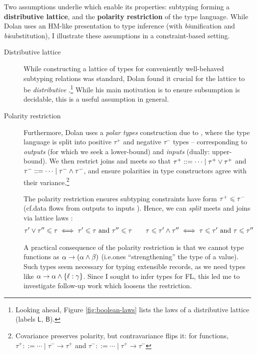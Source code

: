 Two assumptions underlie \mlsub{} which enable its properties: subtyping forming a \textbf{distributive lattice}, and the \textbf{polarity restriction} of the type language. While Dolan uses an HM-like presentation to type inference (with \emph{bi}unification and \emph{bi}substitution), I illustrate these assumptions in a constraint-based setting. \begin{description}
    \item[Distributive lattice] While constructing a lattice of types for conveniently well-behaved subtyping relations was standard, Dolan found it crucial for the lattice to be \emph{distributive} \cite[Section~3.2]{dolan-thesis}.\footnote{Looking ahead, Figure \ref{fig:boolean-laws} lists the laws of a distributive lattice (labels $\mathsf L$, $\mathsf B$).} While his main motivation is to ensure subsumption is decidable, this is a useful assumption in general.
    \item[Polarity restriction] Furthermore, Dolan uses a \emph{polar types} construction due to \textcite{pottier-thesis} \cite[Section~5.1]{dolan-thesis}, where the type language is split into positive $\tau^+$ and negative $\tau^-$ types -- corresponding to \emph{outputs} (for which we seek a lower-bound) and \emph{inputs} (dually: upper-bound). We then restrict joins and meets so that $\tau^+ ::= \cdots \mid \tau^+ \lor \tau^+$ and $\tau^- ::= \cdots \mid \tau^- \land \tau^-$,
    and ensure polarities in type constructors agree with their variance.\footnote{Covariance preserves polarity, but contravariance flips it: for functions, $\tau^+ ::= \cdots \mid \tau^- \to \tau^+$ and $\tau^- ::= \cdots \mid \tau^+ \to \tau^-$}
    
    The polarity restriction ensures subtyping constraints have form $\tau^+ \leqslant \tau^-$ (cf.\@ data flows from outputs to inputs \cite[Section~1.1]{dolan-thesis}). Hence, we can \emph{split} meets and joins via lattice laws \cite{simple-sub}: 
    \begin{align*}
        \tau' \lor \tau'' \leqslant \tau \iff \tau' \leqslant \tau \text{ and } \tau'' \leqslant \tau \qquad
        \tau \leqslant \tau' \land \tau'' \iff \tau \leqslant \tau' \text{ and } \tau \leqslant \tau''
    \end{align*}

    A practical consequence of the polarity restriction is that we cannot type functions as $\alpha \to (\alpha \land \beta)$ (i.e.\@ ones \enquote{strengthening} the type of a value). Such types seem necessary for typing extensible records, as we need types like $\alpha \to \alpha \meet \flrec{\ell : \gamma}$. Since I sought to infer types for FL, this led me to investigate follow-up work which loosens the restriction. 
\end{description}

